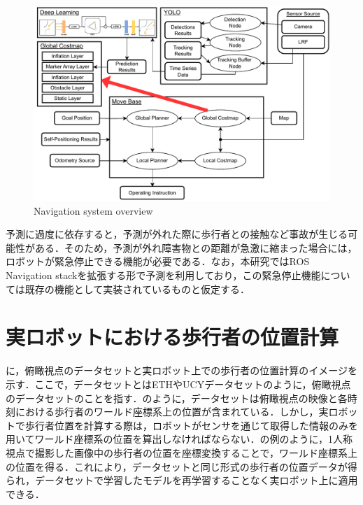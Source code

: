 \begin{figure}[H]
  \centering
 \includegraphics[keepaspectratio, scale=0.76]
      {images/application_system.pdf}
 \caption{Navigation system overview}
 \label{Fig:nav-system}
\end{figure}

\vspace{-20pt}

予測に過度に依存すると，予測が外れた際に歩行者との接触など事故が生じる可能性がある．そのため，予測が外れ障害物との距離が急激に縮まった場合には，ロボットが緊急停止できる機能が必要である．なお，本研究ではROS Navigation stackを拡張する形で予測を利用しており，この緊急停止機能については既存の機能として実装されているものと仮定する．

\vspace{-14pt}

\section{実ロボットにおける歩行者の位置計算}\label{sec:real-robot}
に，俯瞰視点のデータセットと実ロボット上での歩行者の位置計算のイメージを示す．ここで，データセットとはETH\cite{pellegrini2009you-eth}やUCY\cite{lerner2007crowds-ucy}データセットのように，俯瞰視点のデータセットのことを指す．のように，データセットは俯瞰視点の映像と各時刻における歩行者のワールド座標系上の位置が含まれている．しかし，実ロボットで歩行者位置を計算する際は，ロボットがセンサを通じて取得した情報のみを用いてワールド座標系の位置を算出しなければならない．の例のように，1人称視点で撮影した画像中の歩行者の位置を座標変換することで，ワールド座標系上の位置を得る．これにより，データセットと同じ形式の歩行者の位置データが得られ，データセットで学習したモデルを再学習することなく実ロボット上に適用できる．

